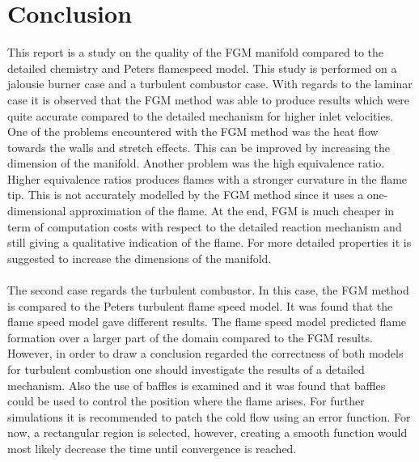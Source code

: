\section{Conclusion}
This report is a study on the quality of the FGM manifold compared to the detailed chemistry and Peters flamespeed model. This study is performed on a jalousie burner case and a turbulent combustor case.
With regards to the laminar case it is observed that the FGM method was able to produce results which were quite accurate compared to the detailed mechanism for higher inlet velocities. One of the problems encountered with the FGM method was the heat flow towards the walls and stretch effects. This can be improved by increasing the dimension of the manifold. Another problem was the high equivalence ratio. Higher equivalence ratios produces flames with a stronger curvature in the 
flame tip. This is not accurately modelled by the FGM method since it uses a one-dimensional approximation of the flame. At the end, FGM is much cheaper in term of computation costs with respect to the detailed reaction mechanism and still giving a qualitative indication of the flame. For more detailed properties it is suggested to increase the dimensions of the manifold. \\ \\ 
The second case regards the turbulent combustor. In this case, the FGM method is compared to the Peters turbulent flame speed model. It was found that the flame speed model gave different results.
The flame speed model predicted flame formation over a larger part of the domain compared to the FGM results. However, in order to draw a conclusion regarded the correctness of both models for turbulent combustion one should investigate the results of a detailed mechanism. Also the use of baffles is examined and it was found that baffles could be used to control the position where the flame arises.  
For further simulations it is recommended to patch the cold
flow using an error function. For now, a rectangular region is selected, however, creating a smooth function would most likely decrease the
time until convergence is reached.

